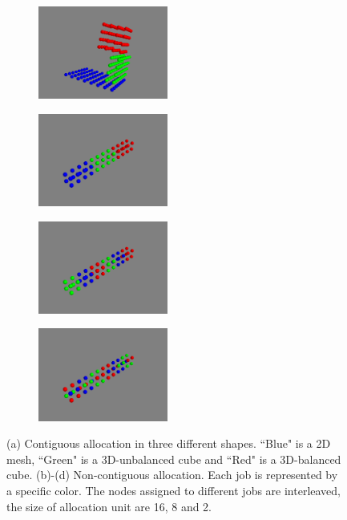 \begin{figure}[htp]
    \centering
    \begin{subfigure}[t]{0.22\textwidth}
        \centering
        \includegraphics[height=1.2in]{figs/allocshape/allocation}
        \caption{ }
        \label{fig:cont_sub1}
    \end{subfigure}%
    \hspace{1em}%
    \begin{subfigure}[t]{0.22\textwidth}
        \centering
        \includegraphics[height=1.2in]{figs/allocshape/unitsize/unit16}
        \caption{ }
        \label{fig:noncont_sub1}
    \end{subfigure}%
    \hspace{1em}%
    \begin{subfigure}[t]{0.22\textwidth}
        \centering
        \includegraphics[height=1.2in]{figs/allocshape/unitsize/unit8}
        \caption{ }
        \label{fig:noncont_sub2}
    \end{subfigure}%
    \hspace{1em}%
    \begin{subfigure}[t]{0.22\textwidth}
        \centering
        \includegraphics[height=1.2in]{figs/allocshape/unitsize/unit2}
        \caption{ }
        \label{fig:noncont_sub3}
    \end{subfigure}%
    \caption{
    (a) Contiguous allocation in three different shapes. 
    ``Blue" is a 2D mesh, ``Green" is a 3D-unbalanced cube and ``Red" is a 3D-balanced cube. 
    (b)-(d) Non-contiguous allocation. Each job is represented by a specific color. 
    The nodes assigned to different jobs are interleaved, 
    the size of allocation unit are 16, 8 and 2.
    }
    \label{fig:alloc-shapes}
\end{figure}

